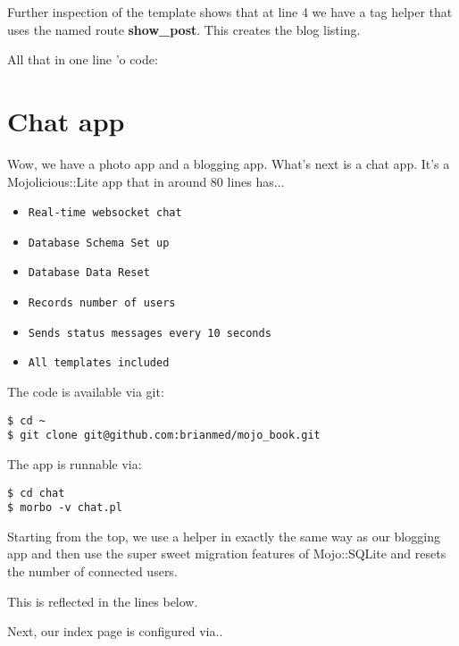 \documentclass[14pt]{extreport}
\begin{document}
Further inspection of the template shows that at line 4 we have a tag helper that
uses the named route \textbf{show\_post}.  This creates the blog listing.

All that in one line 'o code:



\section{Chat app}

Wow, we have a photo app and a blogging app.  What's next is a chat app.  It's
a Mojolicious::Lite app that in around 80 lines has...

\begin{itemize} \itemsep1pt \parskip0pt 
\item \verb|Real-time websocket chat|
\item \verb|Database Schema Set up|
\item \verb|Database Data Reset|
\item \verb|Records number of users|
\item \verb|Sends status messages every 10 seconds|
\item \verb|All templates included|
\end{itemize}

The code is available via git:

\begin{lstlisting}[style=BashOutputStyle]
$ cd ~
$ git clone git@github.com:brianmed/mojo_book.git
\end{lstlisting}

The app is runnable via:

\begin{lstlisting}[style=BashInputStyle]
$ cd chat
$ morbo -v chat.pl
\end{lstlisting}

Starting from the top, we use a helper in exactly the same way as our blogging
app and then use the super sweet migration features of Mojo::SQLite and resets the
number of connected users.

This is reflected in the lines below.



Next, our index page is configured via..
\end{document}
